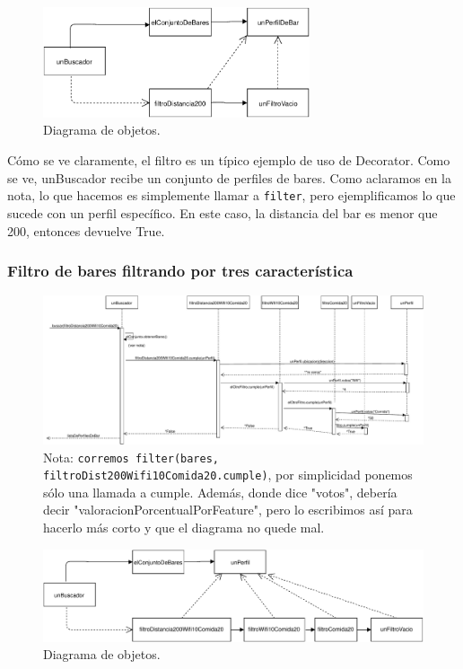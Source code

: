 \begin{figure}[H]
  \centering
  \includegraphics[width=0.7\textwidth]{diagramas/objetos_2.pdf}
  \caption{\normalfont Diagrama de objetos.}
\end{figure}

Cómo se ve claramente, el filtro es un típico ejemplo de uso de Decorator. Como se ve, unBuscador recibe un conjunto de perfiles de bares. Como aclaramos en la nota, lo que hacemos es simplemente llamar a \texttt{filter}, pero ejemplificamos lo que sucede con un perfil específico. En este caso, la distancia del bar es menor que 200, entonces devuelve True.

\subsubsection{Filtro de bares filtrando por tres característica}

\begin{figure}[H]
  \centering
  \includegraphics[width=\textwidth]{diagramas/secuencia_3.pdf}
  \caption{\normalfont Nota: \texttt{corremos filter(bares, filtroDist200Wifi10Comida20.cumple)}, por simplicidad ponemos sólo una llamada a cumple.
Además, donde dice "votos", debería decir "valoracionPorcentualPorFeature", pero lo escribimos así para hacerlo más corto y que el diagrama no quede mal.
}
\end{figure}


\begin{figure}[H]
  \centering
  \includegraphics[width=\textwidth]{diagramas/objetos_3.pdf}
  \caption{\normalfont Diagrama de objetos.}
\end{figure}


